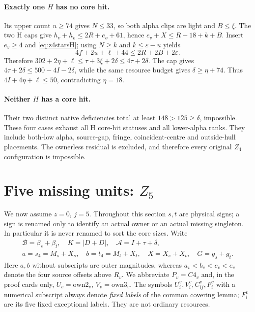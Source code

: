 \documentclass[11pt,letterpaper]{article}
\theoremstyle{definition}\newtheorem{definition}[theorem]{Definition}
\begin{document}
\paragraph{Exactly one $H$ has no core hit.}
Its upper count $u\ge74$ gives $N\le33$, so both alpha clips are light and $B\le\xi$. The two H caps give
$h_v+h_o\le2R+e_o+61$, hence $e_v+X\le R-18+k+B$.
Insert $e_v\ge4$ and \eqref{eq:z4starsH}; using $N\ge k$ and $k\le\varepsilon-u$ yields
\[
 4f+2u+\ell+44\le2R+2B+2\varepsilon.
\]
Therefore $302+2\eta+\ell\le\tau+3\xi+2\delta\le4\tau+2\delta$.
The cap gives $4\tau+2\delta\le500-4I-2\delta$, while the same resource budget gives $\delta\ge\eta+74$. Thus
$4I+4\eta+\ell\le50$, contradicting $\eta=18$.

\paragraph{Neither $H$ has a core hit.}
Their two distinct native deficiencies total at least $148>125\ge\delta$, impossible.
These four cases exhaust all H core-hit statuses and all lower-alpha ranks. They include both-low alpha, source-gap, fringe, coincident-centre and outside-hull placements. The ownerless residual is excluded, and therefore every original $Z_4$ configuration is impossible.


\section{Five missing units: $Z_5$}\label{sec:z5}
We now assume $z=0$, $j=5$.  Throughout this section $s,t$ are
physical signs; a sign is renamed only to identify an actual owner or an
actual missing singleton.  In particular it is never renamed to sort the
core sizes. Write
\[
 \begin{gathered}
 \mathcal B=\beta_s+\beta_t,\quad K=|D+D|,\quad \mathcal A=I+\tau+\delta,\\
 a=s_4=M_s+X_s,\quad b=t_4=M_t+X_t,\quad X=X_s+X_t,\quad G=g_s+g_t.
 \end{gathered}
\]
Here $a,b$ without subscripts are outer magnitudes, whereas
$a_v<b_v<c_v<e_v$ denote the four source offsets above $R_v$.
We abbreviate $P_v=C4_v$ and, in the proof cards only,
$U_v=\mathrm{own2}_v$, $V_v=\mathrm{own3}_v$.
The symbols $U_i^v,V_i^v,C_{ij}^v,F_i^v$ with a numerical subscript
always denote \emph{fixed labels} of the common covering lemma; $F_i^v$
are its five fixed exceptional labels. They are not ordinary resources.
\end{document}
